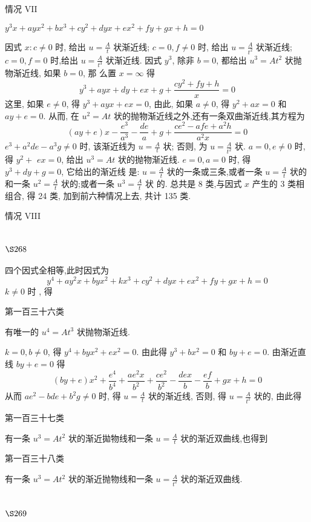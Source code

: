 情况 VII

$y^{3} x+a y x^{2}+b x^{3}+c y^{2}+d y x+e x^{2}+f y+g x+h=0$

因式 $x: c \neq 0$ 时, 给出 $u=\frac{A}{t}$ 状渐近线; $c=0, f \neq 0$ 时, 给出 $u=\frac{A}{t^{2}}$ 状渐近线; $c=0, f=0$ 时,给出 $u=\frac{A}{t^{3}}$ 状渐近线. 因式 $y^{3}$, 除非 $b=0$, 都给出 $u^{3}=A t^{2}$ 状抛物渐近线, 如果 $b=0$, 那 么置 $x=\infty$ 得
\[
y^{3}+a y x+d y+e x+g+\frac{c y^{2}+f y+h}{x}=0
\]
这里, 如果 $e \neq 0$, 得 $y^{3}+a y x+e x=0$, 由此, 如果 $a \neq 0$, 得 $y^{2}+a x=0$ 和 $a y+e=0$. 从而, 在 $u^{2}=A t$ 状的抛物渐近线之外,还有一条双曲渐近线,其方程为
\[
(a y+e) x-\frac{e^{3}}{a^{3}}-\frac{d e}{a}+g+\frac{c e^{2}-a f e+a^{2} h}{a^{2} x}=0
\]
$e^{3}+a^{2} d e-a^{3} g \neq 0$ 时, 该渐近线为 $u=\frac{A}{t}$ 状; 否则, 为 $u=\frac{A}{t^{2}}$ 状. $a=0, e \neq 0$ 时, 得 $y^{2}+$ $e x=0$, 给出 $u^{3}=A t$ 状的抛物渐近线. $e=0, a=0$ 时, 得 $y^{3}+d y+g=0$, 它给出的渐近线 是: $u=\frac{A}{t}$ 状的一条或三条,或者一条 $u=\frac{A}{t}$ 状的和一条 $u^{2}=\frac{A}{t}$ 状的;或者一条 $u^{3}=\frac{A}{t}$ 状 的. 总共是 8 类,与因式 $x$ 产生的 3 类相组合, 得 24 类, 加到前六种情况上去, 共计 135 类.

情况 VIII

\section{$\S 268$}

四个因式全相等,此时因式为
\[
y^{4}+a y^{2} x+b y x^{2}+k x^{3}+c y^{2}+d y x+e x^{2}+f y+g x+h=0
\]
$k \neq 0$ 时 , 得

第一百三十六类

有唯一的 $u^{4}=A t^{3}$ 状抛物渐近线.

$k=0, b \neq 0$, 得 $y^{4}+b y x^{2}+e x^{2}=0$. 由此得 $y^{3}+b x^{2}=0$ 和 $b y+e=0$. 由渐近直线 $b y+e=0$ 得
\[
(b y+e) x^{2}+\frac{e^{4}}{b^{4}}+\frac{a e^{2} x}{b^{2}}+\frac{c e^{2}}{b^{2}}-\frac{d e x}{b}-\frac{e f}{b}+g x+h=0
\]
从而 $a e^{2}-b d e+b^{2} g \neq 0$ 时, 得 $u=\frac{A}{t}$ 状的渐近线, 否则, 得 $u=\frac{A}{t^{2}}$ 状的, 由此得

第一百三十七类

有一条 $u^{3}=A t^{2}$ 状的渐近拋物线和一条 $u=\frac{A}{t}$ 状的渐近双曲线,也得到 

第一百三十八类

有一条 $u^{3}=A t^{2}$ 状的渐近抛物线和一条 $u=\frac{A}{t^{2}}$ 状的渐近双曲线.

\section{$\S 269$}

